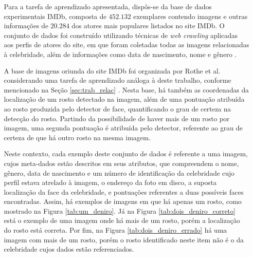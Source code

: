 Para a tarefa de aprendizado apresentada, dispôs-se da base de dados experimentais IMDb, composta de $452.132$ exemplares contendo imagens e outras informações de $20.284$ dos atores mais populares listados no site IMDb. O conjunto de dados foi construído utilizando técnicas de \emph{web crawling} aplicadas aos perfis de atores do site, em que foram coletadas todas as imagens relacionadas à celebridade, além de informações como data de nascimento, nome e gênero \cite{IMDb_derivada}.

A base de imagens oriunda do site IMDb foi organizada por Rothe et al. considerando uma tarefa de aprendizado análoga à deste trabalho, conforme mencionado na Seção  \ref{sec:trab_relac} \cite{rothe2015dex}.  Nesta base, há também as coordenadas da localização de um rosto detectado na imagem, além de uma pontuação atribuída ao rosto produzida pelo detector de face, quantificando o grau de certeza na detecção do rosto. Partindo da possibilidade de haver mais de um rosto por imagem, uma segunda pontuação é atribuída pelo detector, referente ao grau de certeza de que há outro rosto na mesma imagem.

Neste contexto, cada exemplo deste conjunto de dados é referente a uma imagem, cujos meta-dados estão descritos em seus atributos, que compreendem o nome, gênero, data de nascimento e um número de identificação da celebridade cujo perfil estava atrelado à imagem, o endereço da foto em disco, a suposta localização da face da celebridade, e pontuações referentes a duas possíveis faces encontradas. Assim, há exemplos de imagens em que há apenas um rosto, como mostrado na Figura \ref{tab:um_deniro}. Já na Figura \ref{tab:dois_deniro_correto} está o exemplo de uma imagem onde há mais de um rosto, porém a localização do rosto está correta. Por fim, na Figura \ref{tab:dois_deniro_errado} há uma imagem com mais de um rosto, porém o rosto identificado neste item não é o da celebridade cujos dados estão referenciados.

